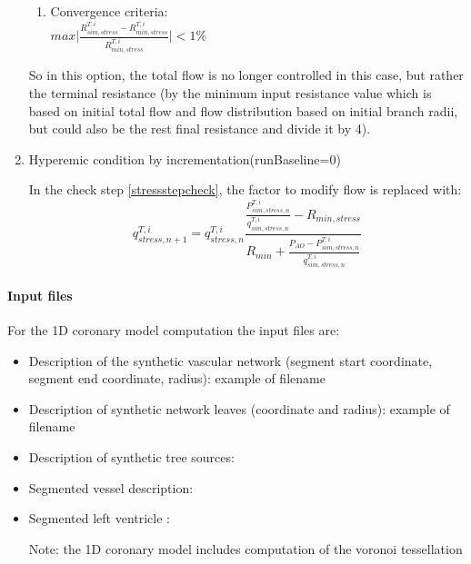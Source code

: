 \documentclass[a4paper, 11pt]{article} %
\begin{document}
\begin{enumerate}[label=(\Alph*)]
\begin{enumerate}[label={\arabic*.}]
\item Convergence criteria: \label{itemStressEnd}\\
$max \lvert \frac{ R_{sim,stress}^{T,i} -R_{min,stress}^{T,i}} {R_{min,stress}^{T,i}} \rvert < 1\% $

\end{enumerate}
So in this option, the total flow is no longer controlled in this case, but rather the terminal resistance (by the minimum input resistance value which is based on initial total flow and flow distribution based on initial branch radii, but could also be the rest final resistance and divide it by 4).\\

\item Hyperemic condition by incrementation(runBaseline=0) \label{itemStressIncrem}

In the check step \ref{stressstepcheck}, the factor to modify flow is replaced with:
\begin{equation}
q^{T,i}_{stress, n+1} = q^{T,i}_{stress, n} \frac{\frac{P^{T,i}_{sim, stress, n}}{q^{T,i}_{sim, stress, n}} - R_{min, stress}}{R_{min} + \frac{P_{AO} - P^{T,i}_{sim, stress, n}}{q^{T,i}_{sim, stress, n}}}
\end{equation}

\end{enumerate}


\paragraph*{Input files}
For the 1D coronary model computation the input files are:
\begin{itemize}
\item Description of the synthetic vascular network (segment start coordinate, segment end coordinate, radius): example of filename 
\item Description of synthetic network leaves (coordinate and radius): example of filename 
\item Description of synthetic tree sources:
\item Segmented vessel description: 
\item Segmented left ventricle : 

Note: the 1D coronary model includes computation of the voronoi tessellation

\end{itemize}
\end{document}
